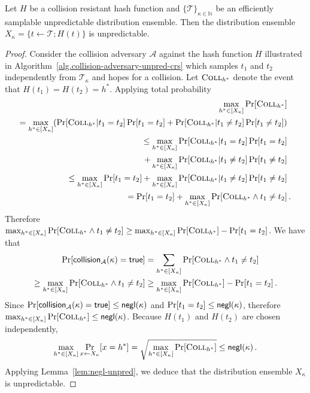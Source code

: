 \begin{lemma}
  Let $H$ be a collision resistant hash function and $\{\mathcal{T}\}_{\kappa\in\mathbb{N}}$ be an
  efficiently samplable unpredictable distribution ensemble. Then the
  distribution ensemble $X_\kappa = \{ t \gets \mathcal{T}; H(t) \}$ is unpredictable.
\end{lemma}
\begin{proof}
  Consider the collision adversary $\mathcal{A}$ against the hash function $H$ illustrated in Algorithm~\ref{alg.collision-adversary-unpred-crs} which samples $t_1$ and $t_2$ independently from $\mathcal{T}_\kappa$ and hopes for a collision. Let $\textsc{Coll}_{h^*}$ denote the event that $H(t_1) = H(t_2) = h^*$.
  Applying total probability
  \begin{align*}
  \max_{h^* \in [X_\kappa]}\Pr[\textsc{Coll}_{h^*}]&
  \\=
  \max_{h^* \in [X_\kappa]}(\Pr[\textsc{Coll}_{h^*}|t_1 = t_2]\Pr[t_1 = t_2]
   + \Pr[\textsc{Coll}_{h^*}|t_1 \neq t_2]\Pr[t_1 \neq t_2])&
  \\\leq
  \max_{h^* \in [X_\kappa]}\Pr[\textsc{Coll}_{h^*}|t_1 = t_2]\Pr[t_1 = t_2]&
  \\ + \max_{h^* \in [X_\kappa]}\Pr[\textsc{Coll}_{h^*}|t_1 \neq t_2]\Pr[t_1 \neq t_2]&
  \\\leq
  \max_{h^* \in [X_\kappa]}\Pr[t_1 = t_2]
  + \max_{h^* \in [X_\kappa]}\Pr[\textsc{Coll}_{h^*}|t_1 \neq t_2]\Pr[t_1 \neq t_2]&
  \\=
  \Pr[t_1 = t_2]
  + \max_{h^* \in [X_\kappa]}\Pr[\textsc{Coll}_{h^*} \land t_1 \neq t_2]&
  \,.
  \end{align*}
  Therefore $\max_{h^* \in [X_\kappa]}\Pr[\textsc{Coll}_{h^*} \land t_1 \neq t_2] \geq \max_{h^* \in [X_\kappa]}\Pr[\textsc{Coll}_{h^*}] - \Pr[t_1 = t_2]$.
  We have that
  \begin{align*}
    \Pr[\textsf{collision}_{\mathcal{A}}(\kappa) = \mathsf{true}] &=
    \sum_{h^* \in [X_\kappa]} \Pr[\textsc{Coll}_{h^*} \land t_1 \neq t_2]\\\geq
    \max_{h^* \in [X_\kappa]} \Pr[\textsc{Coll}_{h^*} \land t_1 \neq t_2]
    &\geq
    \max_{h^* \in [X_\kappa]}\Pr[\textsc{Coll}_{h^*}] - \Pr[t_1 = t_2]\,.
  \end{align*}
  Since $\Pr[\textsf{collision}_{\mathcal{A}}(\kappa) = \mathsf{true}] \leq \textsf{negl}(\kappa)$
  and $\Pr[t_1 = t_2] \leq \textsf{negl}(\kappa)$, therefore $\max_{h^* \in [X_\kappa]} \Pr[\textsc{Coll}_{h^*}] \leq \textsf{negl}(\kappa)$.
  Because $H(t_1)$ and $H(t_2)$ are chosen independently,
  \[
  \max_{h^* \in [X_\kappa]}\Pr_{x \gets X_\kappa}[x = h^*] = \sqrt{\max_{h^* \in [X_\kappa]} \Pr[\textsc{Coll}_{h^*}]} \leq \textsf{negl}(\kappa)\,.
  \]
  Applying Lemma~\ref{lem:negl-unpred}, we deduce that the distribution ensemble $X_\kappa$ is unpredictable.
\end{proof}

